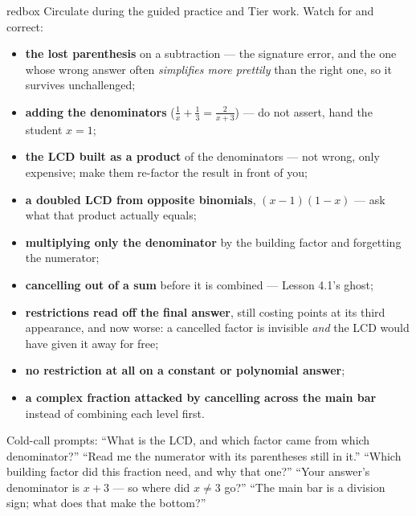 \documentclass[10pt]{article}
\begin{document}
\begin{skillbox}{redbox}
Circulate during the guided practice and Tier work. Watch for and correct:
\begin{itemize}[leftmargin=1.2em, nosep]
  \item \textbf{the lost parenthesis} on a subtraction --- the signature error, and the one whose wrong answer often \emph{simplifies more prettily} than the right one, so it survives unchallenged;
  \item \textbf{adding the denominators} ($\frac1x+\frac13=\frac{2}{x+3}$) --- do not assert, hand the student $x=1$;
  \item \textbf{the LCD built as a product} of the denominators --- not wrong, only expensive; make them re-factor the result in front of you;
  \item \textbf{a doubled LCD from opposite binomials}, $(x-1)(1-x)$ --- ask what that product actually equals;
  \item \textbf{multiplying only the denominator} by the building factor and forgetting the numerator;
  \item \textbf{cancelling out of a sum} before it is combined --- Lesson 4.1's ghost;
  \item \textbf{restrictions read off the final answer}, still costing points at its third appearance, and now worse: a cancelled factor is invisible \emph{and} the LCD would have given it away for free;
  \item \textbf{no restriction at all on a constant or polynomial answer};
  \item \textbf{a complex fraction attacked by cancelling across the main bar} instead of combining each level first.
\end{itemize}
Cold-call prompts: ``What is the LCD, and which factor came from which denominator?'' ``Read me the
numerator with its parentheses still in it.'' ``Which building factor did this fraction need, and why
that one?'' ``Your answer's denominator is $x+3$ --- so where did $x\neq3$ go?'' ``The main bar is a
division sign; what does that make the bottom?''
\end{skillbox}
\end{document}
